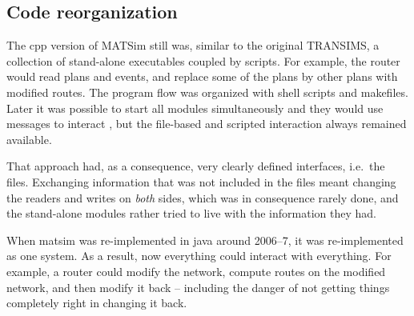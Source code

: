 

%



\subsection{Code reorganization}
\label{sec:matsim-core-reorg}

The \gls{cpp} version of MATSim still was, similar to the original TRANSIMS, a collection of stand-alone executables coupled by scripts.  For example, the router would read plans and events, and replace some of the plans by other plans with modified routes.  The program flow was organized with shell scripts and makefiles.  Later it was possible to start all modules simultaneously and they would use messages to interact \citep[also see][]{GloorNagel2005ped-att04-birkh}, but the file-based and scripted interaction always remained available.

That approach had, as a consequence, very clearly defined interfaces, i.e.\ the files.  Exchanging information that was not included in the files meant changing the readers and writes on \emph{both} sides, which was in consequence rarely done, and the stand-alone modules rather tried to live with the information they had.

When \acrshort{matsim} was re-implemented in \gls{java} around 2006--7, it was re-implemented as one system.  As a result, now everything could interact with everything.  For example, a router could modify the network, compute routes on the modified network, and then modify it back -- including the danger of not getting things completely right in changing it back.  

